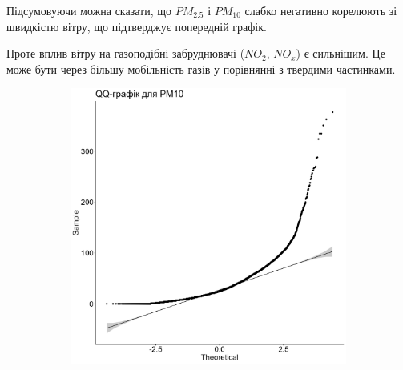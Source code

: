 \documentclass{article}
\begin{document}
\begin{enumerate}
    Підсумовуючи можна сказати, що $PM_{2.5}$ і $ PM_{10}$ слабко негативно корелюють зі швидкістю вітру, що підтверджує попередній графік.
    
    Проте вплив вітру на газоподібні забруднювачі ($NO_2$, $NO_x$) є сильнішим. 
    Це може бути через більшу мобільність газів у порівнянні з твердими частинками.
        
    \newpage
    
    \begin{figure}[h!]
        \centering
        \begin{subfigure}[b]{0.4\linewidth}
            \includegraphics[width=\linewidth]{plots/question1/qq_pm10.png}
        \end{subfigure}
        \begin{subfigure}[b]{0.4\linewidth}

\end{subfigure}
\end{figure}
\end{enumerate}
\end{document}
